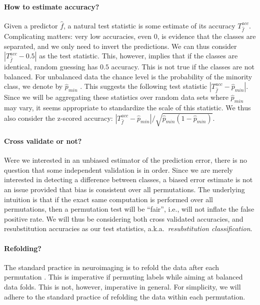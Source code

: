 \documentclass[12pt,a4paper]{article}
\newcommand{\hyp}{f} %
\newcommand{\hypEstim}{\hat{\hyp}} %
\newcommand{\acc}{T^{acc}}
\newcommand{\minority}{\hat{p}_{min}}
\begin{document}
\paragraph{How to estimate accuracy?}
\label{sec:estimate_accuracy}
Given a predictor $\hypEstim$, a natural test statistic is some estimate of its accuracy $\acc_{\hypEstim}$.
Complicating matters: very low accuracies, even $0$, is evidence that the classes are separated, and we only need to invert the predictions. 
We can thus consider $|\acc_{\hypEstim}-0.5|$ as the test statistic.
This, however, implies that if the classes are identical, random guessing has $0.5$ accuracy. This is not true if the classes are not balanced. 
For unbalanced data the chance level is the probability of the minority class, we denote by $\minority$ \citep[ Sec 4.1]{golland_permutation_2005}.
This suggests the following test statistic $|\acc_{\hypEstim}-\minority|$.
Since we will be aggregating these statistics over random data sets where $\minority$ may vary, it seems appropriate to standardize the scale of this statistic. 
We thus also consider the z-scored accuracy: $|\acc_{\hypEstim}-\minority|/\sqrt{\minority(1-\minority)}$. 



\paragraph{Cross validate or not?}
Were we interested in an unbiased estimator of the prediction error, there is no question that some independent validation is in order. 
Since we are merely interested in detecting a difference between classes, a biased error estimate is not an issue provided that bias is consistent over all permutations. 
The underlying intuition is that if the exact same computation is performed over all permutations, then a permutation test will be ``fair'', i.e., will not inflate the false positive rate. 
We will thus be considering both cross validated accuracies, and resubstitution accuracies as our test statistics, a.k.a.\ \emph{resubstitution classification}. 


\paragraph{Refolding?}
The standard practice in neuroimaging is to refold the data after each permutation \citep{pereira_machine_2009}.
This is imperative if permuting labels while aiming at balanced data folds. 
This is not, however, imperative in general. 
For simplicity, we will adhere to the standard practice of refolding the data within each permutation.
\end{document}
